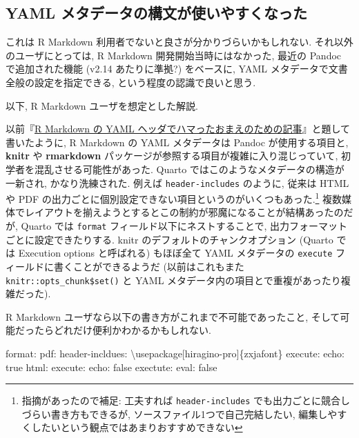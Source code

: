 \documentclass[
  letterpaper,
  DIV=11,
  pandoc,
  ja=standard,
  jafont=noto-otf]{bxjsarticle}
\newenvironment{Shaded}{\begin{snugshade}}{\end{snugshade}}
\newcommand{\AttributeTok}[1]{\textcolor[rgb]{0.00,0.48,0.65}{#1}}
\newcommand{\CharTok}[1]{\textcolor[rgb]{0.13,0.47,0.30}{#1}}
\newcommand{\FunctionTok}[1]{\textcolor[rgb]{0.28,0.35,0.67}{#1}}
\newcommand{\KeywordTok}[1]{\textcolor[rgb]{0.00,0.48,0.65}{#1}}
\begin{document}
\hypertarget{yaml-ux30e1ux30bfux30c7ux30fcux30bfux306eux69cbux6587ux304cux4f7fux3044ux3084ux3059ux304fux306aux3063ux305f}{%
\subsection{YAML
メタデータの構文が使いやすくなった}\label{yaml-ux30e1ux30bfux30c7ux30fcux30bfux306eux69cbux6587ux304cux4f7fux3044ux3084ux3059ux304fux306aux3063ux305f}}

これは R Markdown 利用者でないと良さが分かりづらいかもしれない.
それ以外のユーザにとっては, R Markdown 開発開始当時にはなかった, 最近の
Pandoc で追加された機能 (v2.14 あたりに準拠?) をベースに, YAML
メタデータで文書全般の設定を指定できる, という程度の認識で良いと思う.

以下, R Markdown ユーザを想定とした解説.

以前『\href{https://ill-identified.hatenablog.com/entry/2020/09/05/202403}{R
Markdown の YAML
ヘッダでハマったおまえのための記事}』と題して書いたように, R Markdown の
YAML メタデータは Pandoc が使用する項目と, \textbf{knitr} や
\textbf{rmarkdown} パッケージが参照する項目が複雑に入り混じっていて,
初学者を混乱させる可能性があった. Quarto
ではこのようなメタデータの構造が一新され, かなり洗練された. 例えば
\texttt{header-includes} のように, 従来は HTML や PDF
の出力ごとに個別設定できない項目というのがいくつもあった.\footnote{指摘があったので補足:
  工夫すれば \texttt{header-includes}
  でも出力ごとに競合しづらい書き方もできるが,
  ソースファイル1つで自己完結したい,
  編集しやすくしたいという観点ではあまりおすすめできない}
複数媒体でレイアウトを揃えようとするとこの制約が邪魔になることが結構あったのだが,
Quarto では \texttt{format} フィールド以下にネストすることで,
出力フォーマットごとに設定できたりする. knitr
のデフォルトのチャンクオプション (Quarto では Execution options
と呼ばれる) もほぼ全て YAML メタデータの \texttt{execute}
フィールドに書くことができるようだ (以前はこれもまた
\texttt{knitr::opts\_chunk\$set()} と YAML
メタデータ内の項目とで重複があったり複雑だった).

R Markdown ユーザなら以下の書き方がこれまで不可能であったこと,
そして可能だったらどれだけ便利かわかるかもしれない.

\begin{Shaded}
\begin{Highlighting}[]
\FunctionTok{format}\KeywordTok{:}
\AttributeTok{  }\FunctionTok{pdf}\KeywordTok{:}
\AttributeTok{    }\FunctionTok{header{-}incldues}\KeywordTok{:}
\AttributeTok{      \textbackslash{}usepackage[hiragino{-}pro]\{zxjafont\}}
\AttributeTok{    }\FunctionTok{execute}\KeywordTok{:}
\AttributeTok{      }\FunctionTok{echo}\KeywordTok{:}\AttributeTok{ }\CharTok{true}
\AttributeTok{  }\FunctionTok{html}\KeywordTok{:}
\AttributeTok{    }\FunctionTok{execute}\KeywordTok{:}
\AttributeTok{      }\FunctionTok{echo}\KeywordTok{:}\AttributeTok{ }\CharTok{false}
\FunctionTok{exectute}\KeywordTok{:}
\AttributeTok{  }\FunctionTok{eval}\KeywordTok{:}\AttributeTok{ }\CharTok{false}
\end{Highlighting}
\end{Shaded}
\end{document}
